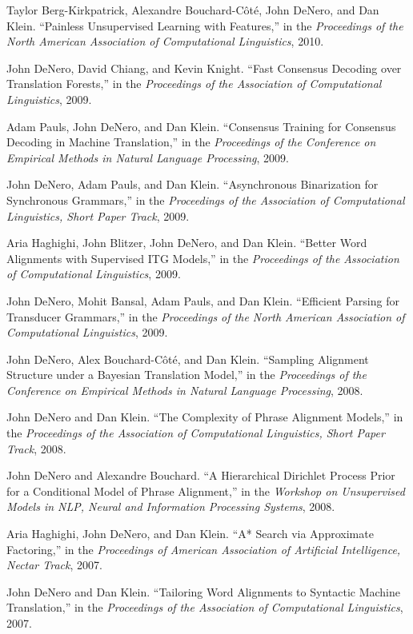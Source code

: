 \documentclass[margin,line]{res}
\begin{document}
\begin{resume}
Taylor Berg-Kirkpatrick, Alexandre Bouchard-Côté, John DeNero, and Dan Klein. ``Painless Unsupervised Learning with Features,'' in the {\it Proceedings of the North American Association of Computational Linguistics}, 2010.

John DeNero, David Chiang, and Kevin Knight. ``Fast Consensus Decoding over Translation Forests,'' in the {\it Proceedings of the Association of Computational Linguistics}, 2009.

Adam Pauls, John DeNero, and Dan Klein. ``Consensus Training for Consensus Decoding in Machine Translation,'' in the {\it Proceedings of the Conference on Empirical Methods in Natural Language Processing}, 2009.

John DeNero, Adam Pauls, and Dan Klein. ``Asynchronous Binarization for Synchronous Grammars,'' in the {\it Proceedings of the Association of Computational Linguistics, Short Paper Track}, 2009.

Aria Haghighi, John Blitzer, John DeNero, and Dan Klein. ``Better Word Alignments with Supervised ITG Models,'' in the {\it Proceedings of the Association of Computational Linguistics}, 2009.

John DeNero, Mohit Bansal, Adam Pauls, and Dan Klein. ``Efficient Parsing for Transducer Grammars,'' in the {\it Proceedings of the North American Association of Computational Linguistics}, 2009.

John DeNero, Alex Bouchard-Côté, and Dan Klein. ``Sampling Alignment Structure under a Bayesian Translation Model,'' in the {\it Proceedings of the Conference on Empirical Methods in Natural Language Processing}, 2008.

John DeNero and Dan Klein. ``The Complexity of Phrase Alignment Models,'' in the {\it Proceedings of the Association of Computational Linguistics, Short Paper Track}, 2008.

John DeNero and Alexandre Bouchard. ``A Hierarchical Dirichlet Process Prior for a Conditional Model of Phrase Alignment,'' in the {\it Workshop on Unsupervised Models in NLP, Neural and Information Processing Systems}, 2008.

Aria Haghighi, John DeNero, and Dan Klein. ``A* Search via Approximate Factoring,'' in the {\it Proceedings of American Association of Artificial Intelligence, Nectar Track}, 2007.

John DeNero and Dan Klein. ``Tailoring Word Alignments to Syntactic Machine Translation,'' in the {\it Proceedings of the Association of Computational Linguistics}, 2007.


\end{resume}
\end{document}
